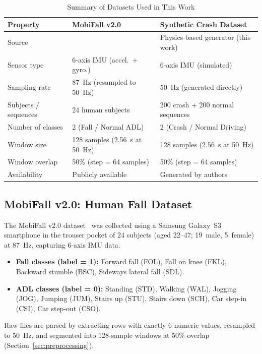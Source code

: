 \documentclass[12pt,a4paper]{article}
\begin{document}
\begin{table}[!ht]
\renewcommand{\arraystretch}{1.3}
\caption{Summary of Datasets Used in This Work}
\label{tab:datasets}
\centering
\small
\begin{tabular}{lll}
\toprule
\textbf{Property} & \textbf{MobiFall v2.0} & \textbf{Synthetic Crash Dataset} \\
\midrule
Source
  & \citet{mobifall}
  & Physics-based generator (this work) \\
Sensor type
  & 6-axis IMU (accel.\ + gyro.)
  & 6-axis IMU (simulated) \\
Sampling rate
  & 87~Hz (resampled to 50~Hz)
  & 50~Hz (generated directly) \\
Subjects / sequences
  & 24 human subjects
  & 200 crash + 200 normal sequences \\
Number of classes
  & 2 (Fall / Normal ADL)
  & 2 (Crash / Normal Driving) \\
Window size
  & 128 samples (2.56~s at 50~Hz)
  & 128 samples (2.56~s at 50~Hz) \\
Window overlap
  & 50\% (step = 64 samples)
  & 50\% (step = 64 samples) \\
Availability
  & Publicly available
  & Generated by authors \\
\bottomrule
\end{tabular}
\end{table}

\subsection{MobiFall v2.0: Human Fall Dataset}

The MobiFall v2.0 dataset~\citep{mobifall} was collected using a Samsung
Galaxy~S3 smartphone in the trouser pocket of 24 subjects (aged 22--47;
19~male, 5~female) at 87~Hz, capturing 6-axis IMU data.

\begin{itemize}
  \item \textbf{Fall classes (label = 1):} Forward fall (FOL), Fall on knee
        (FKL), Backward stumble (BSC), Sideways lateral fall (SDL).
  \item \textbf{ADL classes (label = 0):} Standing (STD), Walking (WAL),
        Jogging (JOG), Jumping (JUM), Stairs up (STU), Stairs down (SCH),
        Car step-in (CSI), Car step-out (CSO).
\end{itemize}

Raw files are parsed by extracting rows with exactly 6 numeric values,
resampled to 50~Hz, and segmented into 128-sample windows at 50\% overlap
(Section~\ref{sec:preprocessing}).
\end{document}

